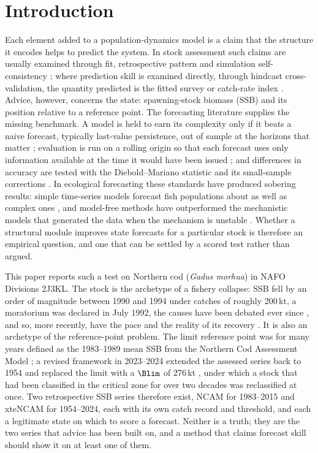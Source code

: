 \section{Introduction}\label{sec:intro}

Each element added to a population-dynamics model is a claim that the structure it encodes helps to predict the system. In stock assessment such claims are usually examined through fit, retrospective pattern and simulation self-consistency \citep{HilbornWalters1992,Punt2016,Maunder2015}; where prediction skill is examined directly, through hindcast cross-validation, the quantity predicted is the fitted survey or catch-rate index \citep{Kell2016,Kell2021,Carvalho2021,Kokkalis2024}. Advice, however, concerns the state: spawning-stock biomass (SSB) and its position relative to a reference point. The forecasting literature supplies the missing benchmark. A model is held to earn its complexity only if it beats a naive forecast, typically last-value persistence, out of sample at the horizons that matter \citep{Makridakis2000,HyndmanKoehler2006,HyndmanAthanasopoulos2021}; evaluation is run on a rolling origin so that each forecast uses only information available at the time it would have been issued \citep{Tashman2000,Bergmeir2012}; and differences in accuracy are tested with the Diebold--Mariano statistic and its small-sample corrections \citep{Diebold1995,Harvey1997,Diebold2015}. In ecological forecasting these standards have produced sobering results: simple time-series models forecast fish populations about as well as complex ones \citep{Ward2014}, and model-free methods have outperformed the mechanistic models that generated the data when the mechanism is unstable \citep{Perretti2013}. Whether a structural module improves state forecasts for a particular stock is therefore an empirical question, and one that can be settled by a scored test rather than argued.

This paper reports such a test on Northern cod (\emph{Gadus morhua}) in NAFO Divisions 2J3KL. The stock is the archetype of a fishery collapse: SSB fell by an order of magnitude between 1990 and 1994 under catches of roughly 200\,kt, a moratorium was declared in July 1992, the causes have been debated ever since \citep{Hutchings1994,Walters1996,Myers1997,Shelton1999}, and so, more recently, have the pace and the reality of its recovery \citep{RoseRowe2015,RoseWalters2019,Rose2026}. It is also an archetype of the reference-point problem. The limit reference point was for many years defined as the 1983--1989 mean SSB from the Northern Cod Assessment Model \citep[NCAM;][]{Cadigan2016,DFO2016}; a revised framework in 2023--2024 extended the assessed series back to 1954 and replaced the limit with a $\Blim$ of 276\,kt \citep{DFO2024a,DFO2024b,Regular2025}, under which a stock that had been classified in the critical zone for over two decades was reclassified at once. Two retrospective SSB series therefore exist, NCAM for 1983--2015 and xteNCAM for 1954--2024, each with its own catch record and threshold, and each a legitimate state on which to score a forecast. Neither is a truth; they are the two series that advice has been built on, and a method that claims forecast skill should show it on at least one of them.

